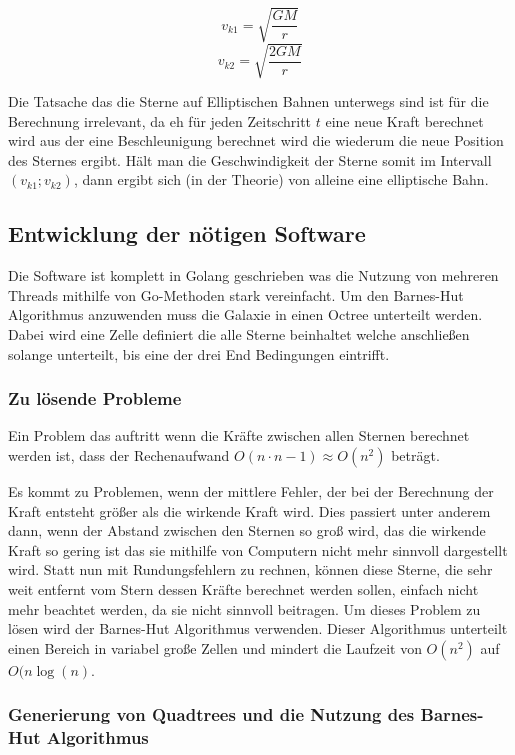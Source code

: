 \begin{equation}
v_{k1} = \sqrt{\frac{GM}{r}}
\end{equation}
\begin{equation}
v_{k2} = \sqrt{\frac{2GM}{r}}
\end{equation}

Die Tatsache das die Sterne auf Elliptischen Bahnen unterwegs sind ist für die
Berechnung irrelevant, da eh für jeden Zeitschritt \( t \) eine neue Kraft
berechnet wird aus der eine Beschleunigung berechnet wird die wiederum die neue
Position des Sternes ergibt.  Hält man die Geschwindigkeit der Sterne somit im
Intervall \( (v_{k1} ; v_{k2}) \), dann ergibt sich (in der Theorie) von
alleine eine elliptische Bahn.

\subsection{Entwicklung der nötigen Software}
Die Software ist komplett in Golang geschrieben was die Nutzung von mehreren
Threads mithilfe von Go-Methoden stark vereinfacht. Um den Barnes-Hut
Algorithmus anzuwenden muss die Galaxie in einen Octree unterteilt werden.
Dabei wird eine Zelle definiert die alle Sterne beinhaltet welche anschließen
solange unterteilt, bis eine der drei End Bedingungen eintrifft.

\subsubsection{Zu lösende Probleme}
Ein Problem das auftritt wenn die Kräfte zwischen allen Sternen berechnet
werden ist, dass der Rechenaufwand \( O(n \cdot n-1) \approx O(n^2) \) beträgt.

Es kommt zu Problemen, wenn der mittlere Fehler, der bei der Berechnung der Kraft
entsteht größer als die wirkende Kraft wird. Dies passiert unter anderem dann,
wenn der Abstand zwischen den Sternen so groß wird, das die wirkende Kraft so gering ist
das sie mithilfe von Computern nicht mehr sinnvoll dargestellt wird.
Statt nun mit Rundungsfehlern zu rechnen, können diese Sterne, die sehr weit entfernt vom
Stern dessen Kräfte berechnet werden sollen, einfach nicht mehr beachtet werden,
da sie nicht sinnvoll beitragen.
Um dieses Problem zu lösen wird der Barnes-Hut Algorithmus verwenden. Dieser Algorithmus
unterteilt einen Bereich in variabel große Zellen und mindert die Laufzeit von \( O(n^2) \) auf
\( O(n \log(n) \).

\subsubsection{Generierung von Quadtrees und die Nutzung des Barnes-Hut
Algorithmus}

